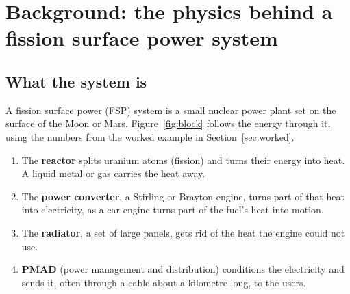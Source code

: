 \documentclass[11pt]{article}
\numberwithin{equation}{section}
\numberwithin{table}{section}
\begin{document}
\section{Background: the physics behind a fission surface power system}\label{sec:primer}

\subsection{What the system is}
A fission surface power (FSP) system is a small nuclear power plant set on the surface
of the Moon or Mars. Figure~\ref{fig:block} follows the energy through it, using the
numbers from the worked example in Section~\ref{sec:worked}.
\begin{enumerate}
  \item The \textbf{reactor} splits uranium atoms (fission) and turns their energy into
        heat. A liquid metal or gas carries the heat away.
  \item The \textbf{power converter}, a Stirling or Brayton engine, turns part of that heat
        into electricity, as a car engine turns part of the fuel's heat into motion.
  \item The \textbf{radiator}, a set of large panels, gets rid of the heat the engine could
        not use.
  \item \textbf{PMAD} (power management and distribution) conditions the electricity and
        sends it, often through a cable about a kilometre long, to the users.
\end{enumerate}
\end{document}
